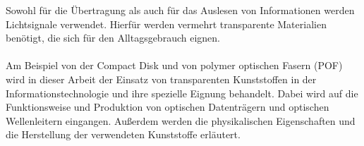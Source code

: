 Sowohl für die Übertragung als auch für das Auslesen von Informationen werden Lichtsignale
verwendet. Hierfür werden vermehrt transparente Materialien benötigt, die sich für den
Alltagsgebrauch eignen.

\paragraph{}
Am Beispiel von der Compact Disk und von polymer optischen Fasern (POF) wird in dieser Arbeit der
Einsatz von transparenten Kunststoffen in der Informationstechnologie und ihre spezielle
Eignung behandelt. Dabei wird auf die Funktionsweise und Produktion von optischen Datenträgern und
optischen Wellenleitern eingangen. Außerdem werden die physikalischen Eigenschaften und die
Herstellung der verwendeten Kunststoffe erläutert.
